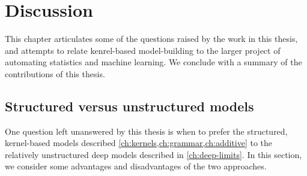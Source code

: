 
\inbpdocument

\chapter{Discussion}
\label{ch:discussion}

This chapter articulates some of the questions raised by the work in this thesis, and attempts to relate kenrel-based model-building to the larger project of automating statistics and machine learning.
We conclude with a summary of the contributions of this thesis.







\section{Structured versus unstructured models}

One question left unanswered by this thesis is when to prefer the structured, kernel-based models described \cref{ch:kernels,ch:grammar,ch:additive} to the relatively unstructured deep \gp{} models described in \cref{ch:deep-limits}.
In this section, we consider some advantages and disadvantages of the two approaches.

